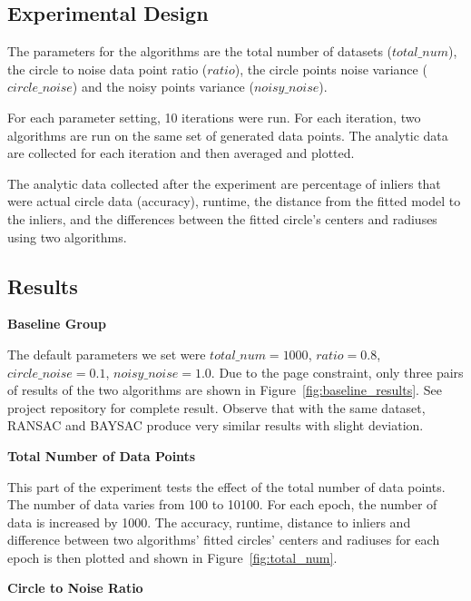\documentclass[10pt,twocolumn,letterpaper]{article}
\begin{document}
\subsection{Experimental Design}

The parameters for the algorithms are the total number of datasets ($total\_num$), the circle to noise data point ratio ($ratio$), the circle points noise variance ($circle\_noise$) and the noisy points variance ($noisy\_noise$).

For each parameter setting, 10 iterations were run. For each iteration, two algorithms are run on the same set of generated data points. The analytic data are collected for each iteration and then averaged and plotted.

The analytic data collected after the experiment are percentage of inliers that were actual circle data (accuracy), runtime, the distance from the fitted model to the inliers, and the differences between the fitted circle's centers and radiuses using two algorithms.


\subsection{Results}
\label{sec:results}


\textbf{Baseline Group}

The default parameters we set were $total\_num = 1000$, $ratio = 0.8$, $circle\_noise = 0.1$, $noisy\_noise = 1.0$. Due to the page constraint, only three pairs of results of the two algorithms are shown in Figure~\ref{fig:baseline_results}. See project repository \cite{ProjectRepo} for complete result. Observe that with the same dataset, RANSAC and BAYSAC produce very similar results with slight deviation.


\textbf{Total Number of Data Points}

This part of the experiment tests the effect of the total number of data points. The number of data varies from 100 to 10100. For each epoch, the number of data is increased by 1000. The accuracy, runtime, distance to inliers and difference between two algorithms' fitted circles' centers and radiuses for each epoch is then plotted and shown in Figure~\ref{fig:total_num}.


\textbf{Circle to Noise Ratio}
\end{document}
